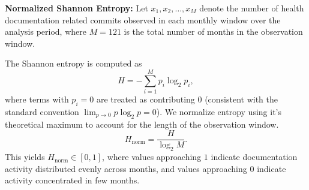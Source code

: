 \documentclass[10pt,conference]{IEEEtran}
\begin{document}
 

{\textbf{Normalized Shannon Entropy:}
Let $x_1, x_2, \dots, x_M$ denote the number of health documentation related commits observed in each monthly window over the analysis period, where 
$M = 121$ is the total number of months in the observation window.

The Shannon entropy is computed as
\[
  H = - \sum_{i=1}^{M} p_i \log_2 p_i,
\]
where terms with $p_i = 0$ are treated as contributing $0$ (consistent with 
the standard convention $\lim_{p \to 0} p \log_2 p = 0$). We normalize entropy using it's theoretical maximum to account for 
the length of the observation window.
\[
  H_{\mathrm{norm}} = \frac{H}{\log_2 M}.
\]
This yields $H_{\mathrm{norm}} \in [0, 1]$, where values approaching $1$ 
indicate documentation activity distributed evenly across months, and values 
approaching $0$ indicate activity concentrated in few months.









}
\end{document}
